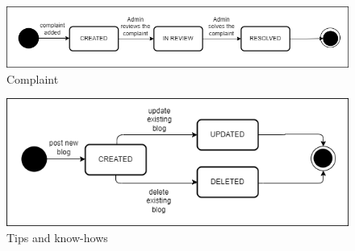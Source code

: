 \begin{figure}[h!]
    \centering
    \includegraphics[width=1\textwidth]{Images/State transition diagrams/State Transition Diagrams-5-Complaint.drawio.png}
    \caption{Complaint}
\end{figure}


\begin{figure}[h!]
    \centering
    \includegraphics[width=1\textwidth]{Images/State transition diagrams/State Transition Diagrams-7-tips&kknowhows.drawio.png}
    \caption{Tips and know-hows}
\end{figure}